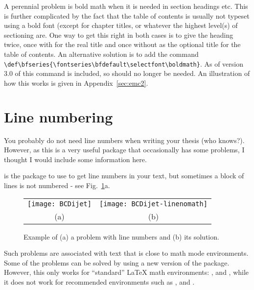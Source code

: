 A perennial problem is bold math when it is needed in
section headings etc. This is further complicated by the fact that the
table of contents is usually not typeset using a bold font (except for
chapter titles, or whatever the highest level(s) of sectioning are.
One way to get this right in both cases is to give the
heading twice, once with  for the real title and once
without as the optional title for the table of contents.
An alternative solution is to add the command\\
\verb|\def\bfseries{\fontseries\bfdefault\selectfont\boldmath}|.
As of version 3.0 of  this command is included,
so  should no longer be needed.
An illustration of how this works is given in Appendix~\ref{sec:emc2}.


\section{Line numbering}
\label{sec:tips:lineno}

You probably do not need line numbers when writing your
thesis (who knows?). However, as this is a very useful package that
occasionally has some problems, I thought I would include some
information here.

 is the package to use to get line numbers in your text,
but sometimes a block of lines is not numbered - see Fig.~\ref{fig:lineno}a.

\begin{figure}[htbp]
  \centering
  \begin{tabular}{cc}
  \texttt{[image: BCDijet]} &
  \texttt{[image: BCDijet-linenomath]}\\
  (a) & (b)
  \end{tabular}
  \caption{Example of (a) a problem with line numbers and (b) its solution.}
  \label{fig:lineno}
\end{figure}

Such problems are associated with text that is close to math mode
environments. Some of the problems can be solved by using a new
version of the  package.
However, this only works for \enquote{standard} \LaTeX{}
math environments: ,  and , while it does
not work for recommended  environments such as ,
 and .

